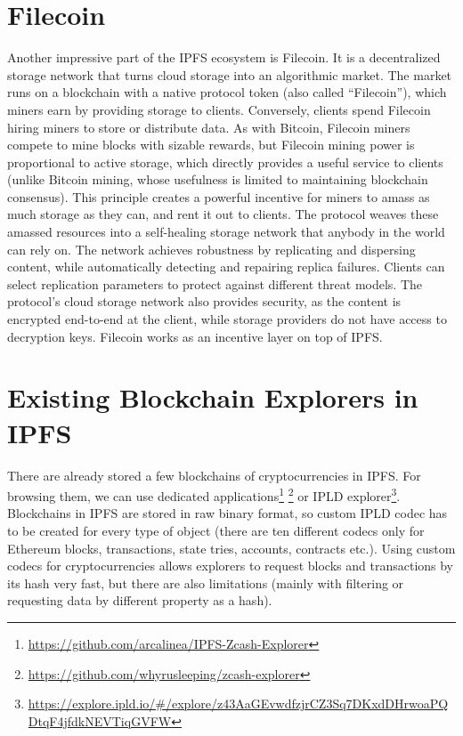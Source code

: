 \section{Filecoin}
Another impressive part of the IPFS ecosystem is Filecoin. It is a decentralized storage network that turns cloud storage into an algorithmic market. The market runs on a blockchain with a native protocol token (also called ``Filecoin''), which miners earn by providing storage to clients. Conversely, clients spend Filecoin hiring miners to store or distribute data. As with Bitcoin, Filecoin miners compete to mine blocks with sizable rewards, but Filecoin mining power is proportional to active storage, which directly provides a useful service to clients (unlike Bitcoin mining, whose usefulness is limited to maintaining blockchain consensus). This principle creates a powerful incentive for miners to amass as much storage as they can, and rent it out to clients. The protocol weaves these amassed resources into a self-healing storage network that anybody in the world can rely on. The network achieves robustness by replicating and dispersing content, while automatically detecting and repairing replica failures. Clients can select replication parameters to protect against different threat models. The protocol’s cloud storage network also provides security, as the content is encrypted end-to-end at the client, while storage providers do not have access to decryption keys. Filecoin works as an incentive layer on top of IPFS. \cite{filecoinWhitepaper}

\section{Existing Blockchain Explorers in IPFS}
There are already stored a few blockchains of cryptocurrencies in IPFS. For browsing them, we can use dedicated applications\footnote{\url{https://github.com/arcalinea/IPFS-Zcash-Explorer}} \footnote{\url{https://github.com/whyrusleeping/zcash-explorer}} or IPLD explorer\footnote{\url{https://explore.ipld.io/\#/explore/z43AaGEvwdfzjrCZ3Sq7DKxdDHrwoaPQDtqF4jfdkNEVTiqGVFW}}. Blockchains in IPFS are stored in raw binary format, so custom IPLD codec has to be created for every type of object (there are ten different codecs only for Ethereum blocks, transactions, state tries, accounts, contracts etc.). Using custom codecs for cryptocurrencies allows explorers to request blocks and transactions by its hash very fast, but there are also limitations (mainly with filtering or requesting data by different property as a hash).

